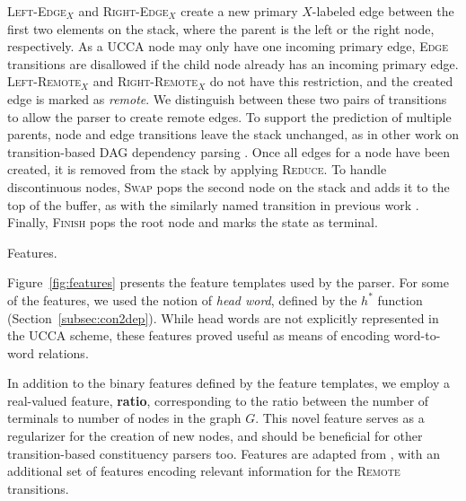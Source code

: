 \documentclass[11pt,letterpaper]{article}
\makeatletter
\newcommand{\secref}[1]{Section~\ref{#1}}
\newcommand{\figref}[1]{Figure~\ref{#1}}
\renewcommand{\paragraph}{
  \@startsection{paragraph}{4}
  {\z@}{.3ex \@plus .3ex \@minus .2ex}{-1em}
  {\normalfont\normalsize\bfseries}
}
\makeatother
\begin{document}
\textsc{Left-Edge$_X$} and \textsc{Right-Edge$_X$} create a new primary $X$-labeled edge between the first two elements on the stack, where the parent is the left or the right node, respectively.
As a UCCA node may only have one incoming primary edge,
\textsc{Edge} transitions are disallowed if the child node already
has an incoming primary edge.
\textsc{Left-Remote$_X$} and \textsc{Right-Remote$_X$} do not have this restriction,
and the created edge is marked as \textit{remote}.
We distinguish between these two pairs of transitions to allow the parser to create remote edges.
To support the prediction of multiple parents, node and edge transitions
leave the stack unchanged, as in other work on
transition-based DAG dependency parsing \cite{sagae2008shift,tokgoz2015transition}.
Once all edges for a node have been created, it is removed from the stack
by applying \textsc{Reduce}.
To handle discontinuous nodes, \textsc{Swap} pops the second
node on the stack and adds it to the top of the buffer, as with the similarly
named transition in previous work \cite{nivre2009non,maier2015discontinuous}.
Finally, \textsc{Finish} pops the root node and marks the state as terminal.

\paragraph{Features.}
\label{subsec:features}

\figref{fig:features} presents the feature templates used by the parser.
For some of the features, we used the notion of \textit{head word},
defined by the $h^*$ function (\secref{subsec:con2dep}).
While head words are not explicitly represented in the UCCA scheme, these
features proved useful as means of encoding word-to-word relations.

In addition to the binary features defined by the feature templates,
we employ a real-valued feature, \textbf{ratio}, corresponding to the ratio between the number of terminals to number of nodes
in the graph $G$. This novel feature serves as a regularizer for the creation of new nodes, and should be beneficial for other transition-based constituency parsers too.
Features are adapted from ,
with an additional set of features encoding relevant information
for the \textsc{Remote} transitions.
\end{document}
